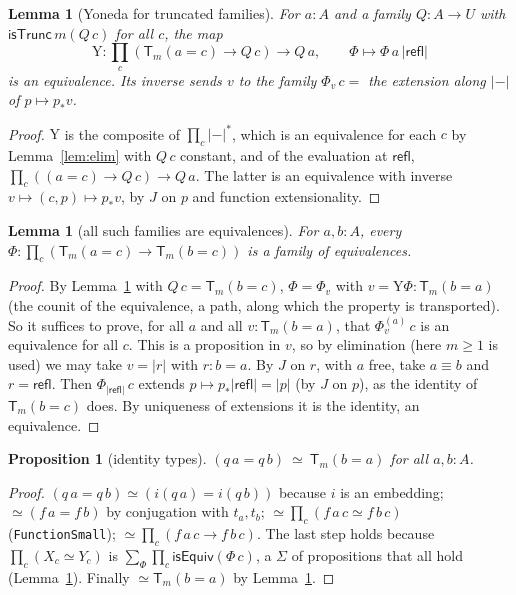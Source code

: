 \documentclass[11pt]{amsart}
\newtheorem{proposition}[theorem]{Proposition}
\newtheorem{lemma}[theorem]{Lemma}
\theoremstyle{definition}
\theoremstyle{remark}
\newcommand{\Tr}[1]{\mathsf{T}_{#1}}
\newcommand{\un}[1]{|#1|}
\newcommand{\code}[1]{\texttt{#1}}
\newcommand{\cT}{\mathsf{isTrunc}}
\begin{document}
\begin{lemma}[Yoneda for truncated families]\label{lem:yoneda}
For $a:A$ and a family $Q:A\to U$ with $\cT\,m(Q\,c)$ for all $c$, the map
\[ \mathrm{Y}:\prod_c(\Tr m(a=c)\to Q\,c)\to Q\,a,\qquad
   \Phi\mapsto\Phi\,a\,\un{\mathsf{refl}} \]
is an equivalence. Its inverse sends $v$ to the family
$\Phi_v\,c=$ the extension along $\un-$ of $p\mapsto p_*v$.
\end{lemma}
\begin{proof}
$\mathrm{Y}$ is the composite of $\prod_c\un-^*$, which is an equivalence
for each $c$ by Lemma~\ref{lem:elim} with $Q\,c$ constant, and of the
evaluation at $\mathsf{refl}$, $\prod_c((a=c)\to Q\,c)\to Q\,a$. The
latter is an equivalence with inverse $v\mapsto(c,p)\mapsto p_*v$,
by $J$ on $p$ and function extensionality.
\end{proof}

\begin{lemma}[all such families are equivalences]\label{lem:alleq}
For $a,b:A$, every $\Phi:\prod_c(\Tr m(a=c)\to\Tr m(b=c))$ is a family of
equivalences.
\end{lemma}
\begin{proof}
By Lemma~\ref{lem:yoneda} with $Q\,c=\Tr m(b=c)$, $\Phi=\Phi_v$ with
$v=\mathrm{Y}\Phi:\Tr m(b=a)$ (the counit of the equivalence, a path,
along which the property is transported). So it suffices to prove, for
all $a$ and all $v:\Tr m(b=a)$, that $\Phi^{(a)}_v\,c$ is an equivalence
for all $c$. This is a proposition in $v$, so by elimination (here
$m\ge1$ is used) we may take $v=\un r$ with $r:b=a$. By $J$ on $r$, with
$a$ free, take $a\equiv b$ and $r=\mathsf{refl}$. Then $\Phi_{\un{\mathsf{refl}}}\,c$ extends
$p\mapsto p_*\un{\mathsf{refl}}=\un p$ (by $J$ on $p$), as the identity
of $\Tr m(b=c)$ does. By uniqueness of extensions it is the identity, an
equivalence.
\end{proof}

\begin{proposition}[identity types]\label{prop:ident}
$(q\,a=q\,b)\ \simeq\ \Tr m(b=a)$ for all $a,b:A$.
\end{proposition}
\begin{proof}
$(q\,a=q\,b)\simeq(i(q\,a)=i(q\,b))$ because $i$ is an embedding;
$\simeq(f\,a=f\,b)$ by conjugation with $t_a,t_b$; $\simeq\prod_c(f\,a\,c\simeq f\,b\,c)$
(\code{FunctionSmall}); $\simeq\prod_c(f\,a\,c\to f\,b\,c)$. The last step
holds because $\prod_c(X_c\simeq Y_c)$ is
$\sum_{\Phi}\prod_c\mathsf{isEquiv}(\Phi\,c)$, a $\Sigma$ of
propositions that all hold (Lemma~\ref{lem:alleq}). Finally
$\simeq\Tr m(b=a)$ by Lemma~\ref{lem:yoneda}.
\end{proof}
\end{document}
